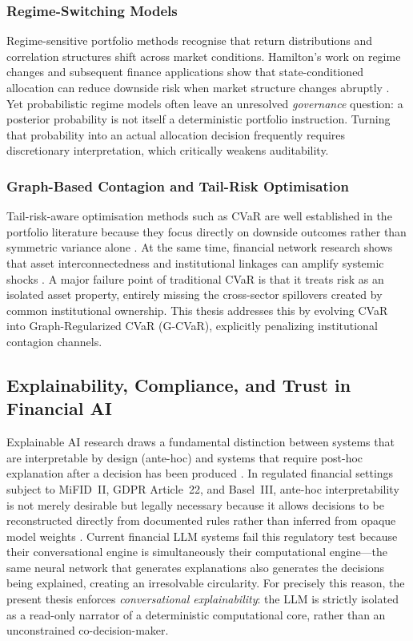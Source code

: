 \documentclass[11pt]{article}
\begin{document}
\subsubsection{Regime-Switching Models}
Regime-sensitive portfolio methods recognise that return distributions and correlation structures shift across market conditions. Hamilton's work on regime changes and subsequent finance applications show that state-conditioned allocation can reduce downside risk when market structure changes abruptly \cite{hamilton1989,ang2002,ang2004,guidolin2007,costa2019}. Yet probabilistic regime models often leave an unresolved \emph{governance} question: a posterior probability is not itself a deterministic portfolio instruction. Turning that probability into an actual allocation decision frequently requires discretionary interpretation, which critically weakens auditability.

\subsubsection{Graph-Based Contagion and Tail-Risk Optimisation}
Tail-risk-aware optimisation methods such as CVaR are well established in the portfolio literature because they focus directly on downside outcomes rather than symmetric variance alone \cite{rockafellar2000,rockafellar2002,krokhmal2002,zhu2009}. At the same time, financial network research shows that asset interconnectedness and institutional linkages can amplify systemic shocks \cite{allen2000,billio2012,acemoglu2015}. A major failure point of traditional CVaR is that it treats risk as an isolated asset property, entirely missing the cross-sector spillovers created by common institutional ownership. This thesis addresses this by evolving CVaR into Graph-Regularized CVaR (G-CVaR), explicitly penalizing institutional contagion channels.

\subsection{Explainability, Compliance, and Trust in Financial AI}
Explainable AI research draws a fundamental distinction between systems that are interpretable by design (ante-hoc) and systems that require post-hoc explanation after a decision has been produced \cite{arrieta2020,adadi2018}. In regulated financial settings subject to MiFID~II, GDPR Article~22, and Basel~III, ante-hoc interpretability is not merely desirable but legally necessary because it allows decisions to be reconstructed directly from documented rules rather than inferred from opaque model weights \cite{mifid2014,gdpr2016,basel2011}. Current financial LLM systems fail this regulatory test because their conversational engine is simultaneously their computational engine---the same neural network that generates explanations also generates the decisions being explained, creating an irresolvable circularity. For precisely this reason, the present thesis enforces \emph{conversational explainability}: the LLM is strictly isolated as a read-only narrator of a deterministic computational core, rather than an unconstrained co-decision-maker.
\end{document}
